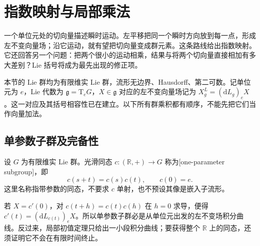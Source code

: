 
% 
% 

\section{指数映射与局部乘法}
\label{g1:sec:1602}

一个单位元处的切向量描述瞬时运动。左平移把同一个瞬时方向放到每一点，形成左不变向量场；沿它运动，就有望把切向量变成群元素。这条路线给出指数映射。它还回答另一个问题：把两个很小的运动相乘，结果与将两个切向量直接相加有多大差别？Lie 括号将成为最先出现的修正项。

\ProseParagraphBreak

本节的 Lie 群均为有限维实 Lie 群，流形无边界、Hausdorff、第二可数。记单位元为 \(e\)，Lie 代数为 \(\mathfrak g=\mathrm{T}_eG\)，\(X\in\mathfrak g\) 对应的左不变向量场记为 \(X^L_g=(\mathrm{d}L_g)_eX\)。这一对应及其括号相容性已在建立。以下所有群乘积都有顺序，不能先把它们当作向量加法。

\subsection{单参数子群及完备性}
\label{g1:subsec:1602:01}

\begin{definition}\label{g1:def:one-parameter-subgroup}
	设 \(G\) 为有限维实 Lie 群。光滑同态 \(c:(\mathbb R,+)\to G\) 称为[one-parameter subgroup]，即
	\[
		c(s+t)=c(s)c(t),\qquad c(0)=e.
	\]
	这里名称指带参数的同态，不要求 \(c\) 单射，也不预设其像是嵌入子流形。
\end{definition}

若 \(X=c'(0)\)，对 \(c(t+h)=c(t)c(h)\) 在 \(h=0\) 求导，便得 \(c'(t)=(\mathrm{d}L_{c(t)})_eX\)。所以单参数子群必是从单位元出发的左不变场积分曲线。反过来，局部初值定理只给出一小段积分曲线；要获得整个 \(\mathbb R\) 上的同态，还须证明它不会在有限时间终止。

